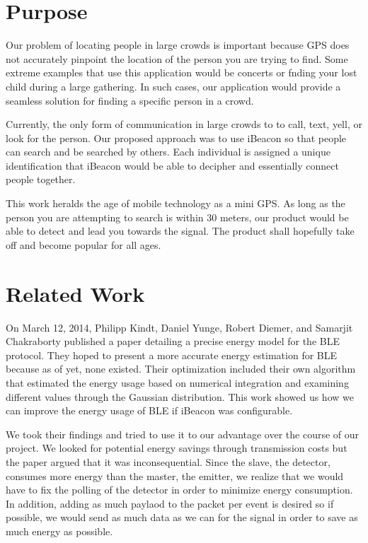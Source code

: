 \documentclass[10pt]{sensys-proc}
\begin{document}
\section{Purpose}
Our problem of locating people in large crowds is important because GPS does not accurately pinpoint the location of the person you are trying to find. Some extreme examples that use this application would be concerts or fnding your lost child during a large gathering. In such cases, our application would provide a seamless solution for finding a specific person in a crowd.

Currently, the only form of communication in large crowds to to call, text, yell, or look for the person. Our proposed approach was to use iBeacon so that people can search and be searched by others. Each individual is assigned a unique identification that iBeacon would be able to decipher and essentially connect people together.

This work heralds the age of mobile technology as a mini GPS. As long as the person you are attempting to search is within 30 meters, our product would be able to detect and lead you towards the signal. The product shall hopefully take off and become popular for all ages.

\section{Related Work}
On March 12, 2014, Philipp Kindt, Daniel Yunge, Robert Diemer, and Samarjit Chakraborty published a paper detailing a precise energy model for the BLE protocol. \cite{energy:modeling} They hoped to present a more accurate energy estimation for BLE because as of yet, none existed. Their optimization included their own algorithm that estimated the energy usage based on numerical integration and examining different values through the Gaussian distribution. This work showed us how we can improve the energy usage of BLE if iBeacon was configurable.

We took their findings and tried to use it to our advantage over the course of our project. We looked for potential energy savings through transmission costs but the paper argued that it was inconsequential. Since the slave, the detector, consumes more energy than the master, the emitter, we realize that we would have to fix the polling of the detector in order to minimize energy consumption. In addition, adding as much paylaod to the packet per event is desired so if possible, we would send as much data as we can for the signal in order to save as much energy as possible.
\end{document}
